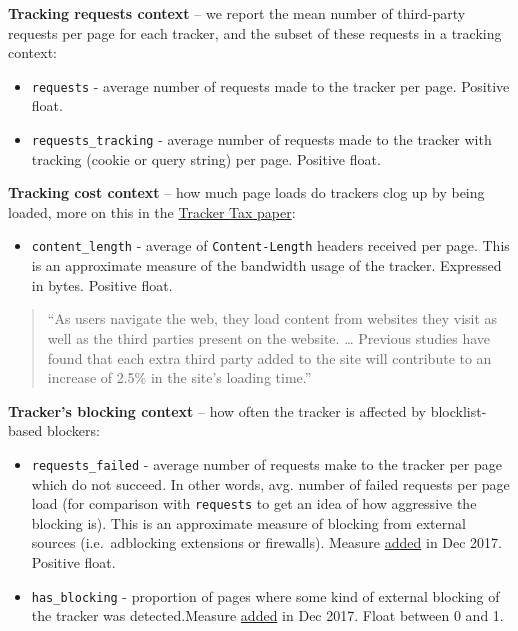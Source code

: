 \documentclass[
]{article}
\providecommand{\tightlist}{%
  \setlength{\itemsep}{0pt}\setlength{\parskip}{0pt}}
\begin{document}
\textbf{Tracking requests context} -- we report the mean number of
third-party requests per page for each tracker, and the subset of these
requests in a tracking context:

\begin{itemize}
\item
  \texttt{requests} - average number of requests made to the tracker per
  page. Positive float.
\item
  \texttt{requests\_tracking} - average number of requests made to the
  tracker with tracking (cookie or query string) per page. Positive
  float.
\end{itemize}

\textbf{Tracking cost context} -- how much page loads do trackers clog
up by being loaded, more on this in the \href{https://t.ly/KnKP}{Tracker
Tax paper}:

\begin{itemize}
\tightlist
\item
  \texttt{content\_length} - average of \texttt{Content-Length} headers
  received per page. This is an approximate measure of the bandwidth
  usage of the tracker. Expressed in bytes. Positive float.
\end{itemize}

\begin{quote}
``As users navigate the web, they load content from websites they visit
as well as the third parties present on the website. \ldots{} Previous
studies have found that each extra third party added to the site will
contribute to an increase of 2.5\% in the site's loading time.''
\end{quote}

\textbf{Tracker's blocking context} -- how often the tracker is affected
by blocklist-based blockers:

\begin{itemize}
\item
  \texttt{requests\_failed} - average number of requests make to the
  tracker per page which do not succeed. In other words, avg. number of
  failed requests per page load (for comparison with \texttt{requests}
  to get an idea of how aggressive the blocking is). This is an
  approximate measure of blocking from external sources (i.e.~adblocking
  extensions or firewalls). Measure \href{https://bit.ly/2RSjBDX}{added}
  in Dec 2017. Positive float.
\item
  \texttt{has\_blocking} - proportion of pages where some kind of
  external blocking of the tracker was detected.Measure
  \href{https://bit.ly/2RSjBDX}{added} in Dec 2017. Float between 0 and
  1.
\end{itemize}
\end{document}
